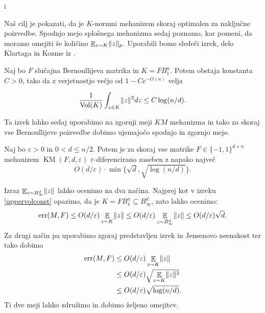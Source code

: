 i\documentclass[mat1]{fmfdelo}
\DeclarePairedDelimiter{\norm}{\lVert}{\rVert}
\DeclareMathOperator*{\E}{\mathbb E}
\DeclareMathOperator{\Vol}{Vol}
\DeclareMathOperator{\KM}{KM}
\DeclareMathOperator*{\err}{err}
\begin{document}
Naš cilj je pokazati, da je $K$-normni mehanizem skoraj optimalen za naključne poizvedbe. Spodnjo mejo splošnega mehanizma sedaj poznamo, kar pomeni, da moramo omejiti še količino $\E_{z \sim K} \norm{z}_p$. Uporabili bomo sledeči izrek, delo Klartaga in Kozme iz \cite{klartag}.

\begin{izrek}
    Naj bo $F$ slučajna Bernoullijeva matrika in $K=FB_1^n$. Potem obstaja konstanta $C>0$, tako da z verjetnostjo večjo od $1-Ce^{-O(n)}$ velja
    
    \begin{equation*}
        \frac{1}{\Vol(K)} \int_{z \in K} \norm{z}^2 dz \leq C \log(n/d).
    \end{equation*}
\end{izrek}

Ta izrek lahko sedaj uporabimo na zgornji meji $KM$ mehanizma in tako za skoraj vse Bernoullijeve poizvedbe dobimo ujemajočo spodnjo in zgornjo mejo.

\begin{posledica} \label{randomupper}
    Naj bo $\varepsilon >0$ in $0 < d \leq n/2$. Potem je za skoraj vse matrike $F \in \{-1, 1\}^{d \times n}$ mehanizem $\KM(F,d,\varepsilon)$ $\varepsilon$-diferencirano zaseben z napako največ
    \begin{equation*}
        O(d/\varepsilon) \cdot \min \{\sqrt{d}, \sqrt{\log(n/d)}\}.
    \end{equation*}
\end{posledica}

\begin{dokaz}
    Izraz $\E_{z \sim B_\infty^d} \norm{z}$ lahko ocenimo na dva načina. Najprej kot v izreku \ref{uppervolconst} opazimo, da je $K=FB_1^n \subseteq B_\infty^d$, zato lahko ocenimo:
    \begin{equation*}
        \err(M, F) \leq O(d / \varepsilon) \E_{z \sim K} \norm{z} \leq O(d / \varepsilon) \E_{z \sim B_\infty^d} \norm{z} \leq O(d / \varepsilon) \sqrt{d}.
    \end{equation*}
    Za drugi način pa uporabimo zgoraj predstavljen izrek in Jensenovo neenakost ter tako dobimo
    \begin{align*}
        \err(M, F) &\leq O(d / \varepsilon) \E_{z \sim K} \norm{z} \\
        &\leq O(d / \varepsilon) \sqrt{\E_{z \sim K} \norm{z}^2} \\
        &\leq O(d / \varepsilon) \sqrt{\log(n/d)}.
    \end{align*}
    Ti dve meji lahko združimo in dobimo željeno omejitev.
\end{dokaz}
\end{document}
